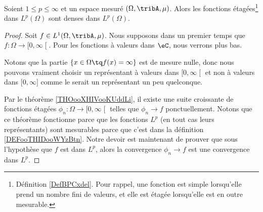 \begin{proposition}      \label{PROPooUQUBooAWgNhm}
	Soient \( 1\leq p\leq\infty\) et un espace mesuré \( (\Omega,\tribA,\mu)\). Alors les fonctions étagées\footnote{Définition \ref{DefBPCxdel}. Pour rappel, une fonction est simple lorsqu'elle prend un nombre fini de valeurs, et elle est étagée lorsqu'elle est en outre mesurable.} dans \( L^p(\Omega)\) sont denses dans \( L^p(\Omega)\).
\end{proposition}

\begin{proof}
	Soit \( f\in L^1(\Omega,\tribA,\mu)\). Nous supposons dans un premier temps que \( f\colon \Omega\to \mathopen[ 0 , \infty \mathclose[\). Pour les fonctions à valeurs dans \( \eC\), nous verrons plus bas.

	Notons que la partie \( \{ x\in \Omega\tq f(x)=\infty \}\) est de mesure nulle, donc nous pouvons vraiment choisir un représentant à valeurs dans \( \mathopen[ 0 , \infty \mathclose[\) et non à valeurs dans \( \mathopen[ 0 , \infty \mathclose]\) comme le serait un représentant un peu quelconque.

	Par le théorème \ref{THOooXHIVooKUddLi}, il existe une suite croissante de fonctions étagées \( \phi_n\colon \Omega\to \mathopen[ 0 , \infty \mathclose[\) telles que \( \phi_n\to f\) ponctuellement. Notons que ce théorème fonctionne parce que les fonctions \( L^p\) (en tout cas leurs représentants) sont mesurables parce que c'est dans la définition \ref{DEFooTHIDooWYzBtn}.  Notre devoir est maintenant de prouver que sous l'hypothèse que \( f\) est dans \( L^p\), alors la convergence \( \phi_n\to f\) est une convergence dans \( L^p\).


\end{proof}
